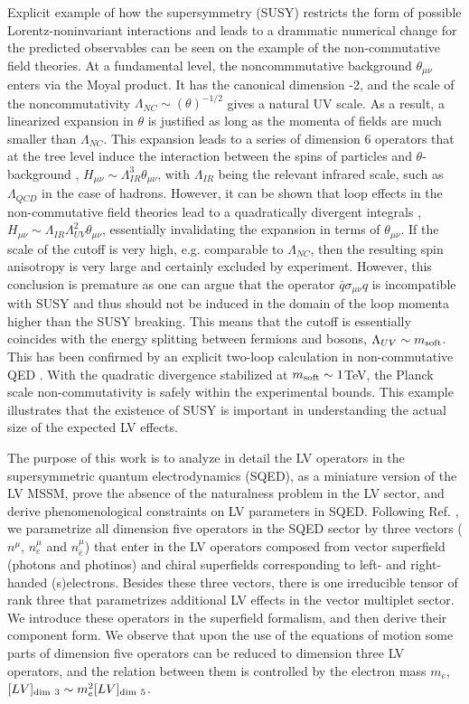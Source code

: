 \documentclass[12pt]{revtex4}
\begin{document}
Explicit example of how the supersymmetry (SUSY) restricts the form of possible 
Lorentz-noninvariant interactions and leads to a drammatic numerical change 
for the predicted observables can be seen on the example of the
non-commutative field theories.  At a fundamental level, the
noncommmutative background  
$\theta_{\mu\nu}$ enters via the Moyal product. It has the canonical 
dimension -2, and the scale of the noncommutativity $\Lambda_{NC}
\sim(\theta)^{-1/2}$ gives a natural UV scale. 
As a result, a linearized expansion in $\theta$ is justified 
as long as the momenta of fields  are much smaller than $\Lambda_{NC}$. 
This expansion leads to a series of dimension 6 operators
that at the tree level induce the interaction between the spins of 
particles and $\theta$-background \cite{MPR1}, $H_{\mu\nu} \sim \Lambda_{IR}^3\theta_{\mu\nu}$,
with $ \Lambda_{IR}$ being the relevant infrared scale, such as $\Lambda_{QCD}$ 
in the case of hadrons. However, it can be shown that loop effects in the 
non-commutative field theories lead to a quadratically divergent integrals \cite{UCSC},
$H_{\mu\nu} \sim \Lambda_{IR}\Lambda_{UV}^2\theta_{\mu\nu}$, essentially
invalidating the expansion in terms of $\theta_{\mu\nu}$. 
If the scale of the cutoff is very high, e.g. comparable to $\Lambda_{NC}$, 
then the resulting spin anisotropy is very large and certainly excluded 
by experiment. However, this conclusion is premature as 
one can argue that the operator $\bar q \sigma_{\mu\nu} q$ 
is incompatible with SUSY \cite{MPR2} and thus should not be induced 
in the domain of the loop momenta higher than the SUSY breaking. 
This means that the cutoff is essentially coincides with the 
energy splitting between fermions and bosons, $\Lambda_{UV} \sim m_{\rm soft}$. 
This has been confirmed by an explicit two-loop calculation in non-commutative 
QED \cite{WMC2}. With the quadratic divergence stabilized at $m_{\rm soft}\sim 1 $TeV,
the Planck scale non-commutativity is safely within the experimental 
bounds. This example illustrates that the existence of SUSY is important in 
understanding the actual size of the expected LV effects. 

The purpose of this work is to analyze in detail the LV operators in 
the supersymmetric quantum electrodynamics (SQED),
as a miniature version of the LV MSSM, prove the absence of the
naturalness problem in the LV sector, and derive phenomenological
constraints on LV parameters in SQED.  Following
Ref. \cite{GrootNibbelink:2004za}, we  parametrize all dimension five
operators in the SQED sector  by three vectors ($n^{\mu}$,
$n^{\mu}_{e}$ and $n^{\mu}_{\bar e}$) that enter in the LV operators
composed  from vector superfield (photons and photinos) and chiral
superfields corresponding to left- and right-handed (s)electrons. 
Besides these three vectors, there is one irreducible tensor of rank three 
that parametrizes additional LV effects in the vector multiplet sector. 
We introduce these operators in the superfield formalism, and then
derive their component form. We observe that upon the use of the
equations of motion some parts of dimension five operators can be
reduced to dimension three LV operators, and the relation  
between them is controlled by the electron mass $m_e$,  
$[LV]_{\rm dim~3} \sim m_e^2 [LV]_{\rm dim~5}$.
\end{document}

